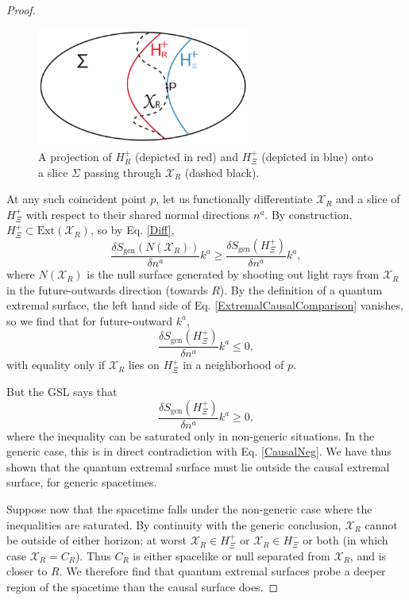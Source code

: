 \documentclass[12pt]{article}
\theoremstyle{remark}
\numberwithin{equation}{section}
\numberwithin{equation}{section}
\begin{document}
\begin{proof}
\begin{figure}[ht]
\begin{center}
\includegraphics[width=7cm]{CausalSurfaceDefv2.pdf} 
\caption{\small{A projection of $H^{+}_{R}$ (depicted in red) and $H^{+}_{\Xi}$ (depicted in blue) onto a slice $\Sigma$ passing through $\mathcal{X}_{R}$ (dashed black).}}
\label{Daleth}
\end{center}
\end{figure}
At any such coincident point $p$, let us functionally differentiate $\mathcal{X}_{R}$ and a slice of $H^+_\Xi$ with respect to their shared normal directions $n^{a}$.  By construction, $H^+_\Xi\subset \text{Ext}(\mathcal{X}_{R})$, so by Eq. \ref{Diff},
\begin{equation}\frac{\delta S_{\text{gen}} (N(\mathcal{X}_{R}))}{\delta n^{a}}k^{a} \geq \frac{\delta S_{\text{gen}} (H^+_\Xi)}{\delta n^{a}}k^{a},  \label{ExtremalCausalComparison}
\end{equation}
where $N(\mathcal{X}_{R})$ is the null surface generated by shooting out light rays from $\mathcal{X}_{R}$ in the future-outwards direction (towards $R$).  By the definition of a quantum extremal surface, the left hand side of Eq. \ref{ExtremalCausalComparison} vanishes, so we find that for future-outward $k^a$,
\begin{equation}
\frac{\delta  S_{\text{gen}} (H^+_\Xi)}{\delta n^{a}}k^{a} \leq 0 \label{CausalNeg},
\end{equation}
with equality only if $\mathcal{X}_{R}$ lies on $H^+_\Xi$ in a neighborhood of $p$.

But the GSL says that
\begin{equation} \frac{\delta  S_{\text{gen}} (H^+_\Xi)}{\delta n^{a}}k^{a} \geq  0, \label{CausalFut} \end{equation}
where the inequality can be saturated only in non-generic situations.  In the generic case, this is in direct contradiction with Eq. \ref{CausalNeg}.  We have thus shown that the quantum extremal surface must lie outside the causal extremal surface, for generic spacetimes.

Suppose now that the spacetime falls under the non-generic case where the inequalities are saturated.  By continuity with the generic conclusion, $\mathcal{X}_{R}$ cannot be outside of either horizon; at worst $\mathcal{X}_{R} \in H^+_\Xi$ or $\mathcal{X}_{R} \in H^-_\Xi$ or both (in which case $\mathcal{X}_{R} = C_R$).  Thus $C_R$ is either spacelike or null separated from $\mathcal{X}_{R}$, and is closer to $R$.  We therefore find that quantum extremal surfaces probe a deeper region of the spacetime than the causal surface does.


\end{proof}
\end{document}
